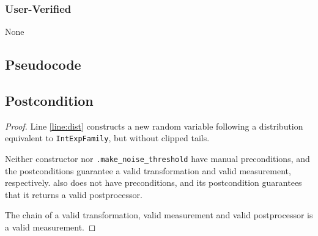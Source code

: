 \documentclass{article}
\begin{document}
\subsubsection*{User-Verified}
None

\subsection*{Pseudocode}


\subsection*{Postcondition}
\begin{theorem}
\end{theorem}

\begin{proof}
    Line \ref{line:dist} constructs a new random variable following a distribution equivalent to \texttt{IntExpFamily}, 
    but without clipped tails.

    Neither constructor  nor
    \texttt{.make\_noise\_threshold} have manual preconditions, 
    and the postconditions guarantee a valid transformation and valid measurement, respectively.
     also does not have preconditions,
    and its postcondition guarantees that it returns a valid postprocessor.

    The chain of a valid transformation, valid measurement and valid postprocessor is a valid measurement.
\end{proof}
\end{document}
